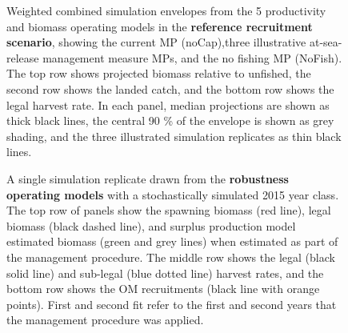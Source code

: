 \documentclass[11pt]{book}
\begin{document}
\begin{landscape}
\begin{figure}[htb]
{}

\caption{Weighted combined simulation envelopes from the 5 productivity and biomass operating models in the \textbf{reference recruitment scenario}, showing the current MP (noCap),three illustrative at-sea-release management measure MPs, and the no fishing MP (NoFish). The top row shows projected biomass relative to unfished, the second row shows the landed catch, and the bottom row shows the legal harvest rate. In each panel, median projections are shown as thick black lines, the central 90 \% of the envelope is shown as grey shading, and the three illustrated simulation replicates as thin black lines.}\label{fig:unnamed-chunk-22}
\end{figure}
\newpage
\begin{figure}[htb]

{\centering {} 

}

\caption{A single simulation replicate drawn from the \textbf{robustness operating models} with a stochastically simulated 2015 year class. The top row of panels show the spawning biomass (red line), legal biomass (black dashed line), and surplus production model estimated biomass (green and grey lines) when estimated as part of the management procedure. The middle row shows the legal (black solid line) and sub-legal (blue dotted line) harvest rates, and the bottom row shows the OM recruitments (black line with orange points). First and second fit refer to the first and second years that the management procedure was applied.}\label{fig:unnamed-chunk-23}
\end{figure}
\newpage
\begin{figure}[htb]


\end{figure}
\end{landscape}
\end{document}
